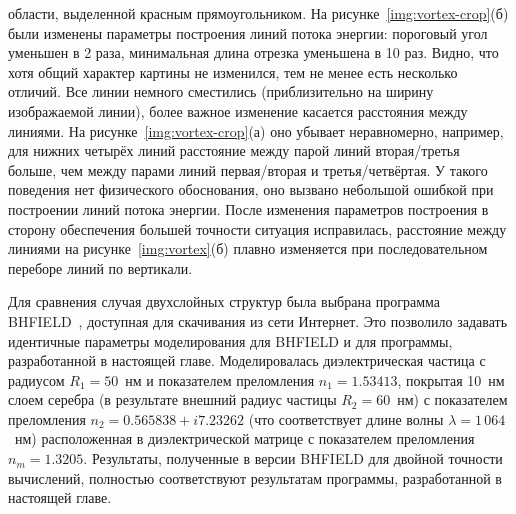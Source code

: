 области, выделенной красным прямоугольником. На
рисунке~\ref{img:vortex-crop}(б) были изменены параметры построения
линий потока энергии: пороговый угол уменьшен в 2 раза, минимальная
длина отрезка уменьшена в 10 раз. Видно, что хотя общий характер
картины не изменился, тем не менее есть несколько отличий. Все линии
немного сместились (приблизительно на ширину изображаемой линии), 
более важное изменение касается расстояния между линиями. На
рисунке~\ref{img:vortex-crop}(а) оно убывает неравномерно, например,
для нижних четырёх линий расстояние между парой линий вторая/третья
больше, чем между парами линий первая/вторая и третья/четвёртая. У
такого поведения нет физического обоснования, оно вызвано небольшой
ошибкой при построении линий потока энергии.  После изменения
параметров построения в сторону обеспечения большей точности ситуация
исправилась, расстояние между линиями на рисунке~\ref{img:vortex}(б)
плавно изменяется при последовательном переборе линий по вертикали.
 
Для сравнения случая двухслойных структур была выбрана программа
BHFIELD~\cite{Suzuki-2008,Suzuki-2013}, доступная для скачивания из
сети Интернет.  Это позволило задавать идентичные параметры
моделирования для BHFIELD и для программы, разработанной в настоящей
главе. Моделировалась диэлектрическая частица с радиусом $R_1=50$~нм и
показателем преломления $n_1=1.53413$, покрытая 10~нм слоем серебра (в
результате внешний радиус частицы $R_2=60$~нм) с показателем
преломления $n_2=0.565838+i7.23262$ (что соответствует длине волны
$\lambda = 1\,064$~нм) расположенная в диэлектрической матрице с показателем
преломления $n_m=1.3205$.  Результаты, полученные в версии BHFIELD для
двойной точности вычислений, полностью соответствуют результатам
программы, разработанной в настоящей главе.

